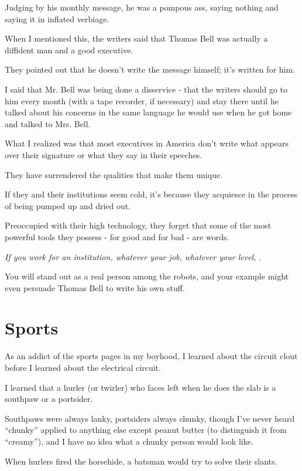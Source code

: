 \documentclass{book}
\numberwithin{equation}{section}
\begin{document}
Judging by his monthly message, he was a pompous ass, saying nothing and saying it in inflated verbiage.

%
When I mentioned this, the writers said that Thomas Bell was actually a diffident man and a good executive.

They pointed out that he doesn't write the message himself; it's written for him.

I said that Mr. Bell was being done a disservice - that the writers should go to him every month (with a tape recorder, if necessary) and stay there until he talked about his concerns in the same language he would use when he got home and talked to Mrs. Bell.

%
What I realized was that most executives in America don't write what appears over their signature or what they say in their speeches.

They have surrendered the qualities that make them unique.

If they and their institutions seem cold, it's because they acquiesce in the process of being pumped up and dried out.

Preoccupied with their high technology, they forget that some of the most powerful tools they possess - for good and for bad - are words.

%
\textit{If you work for an institution, whatever your job, whatever your level, }.

You will stand out as a real person among the robots, and your example might even persuade Thomas Bell to write his own stuff.


\chapter{Sports}

As an addict of the sports pages in my boyhood, I learned about the circuit clout before I learned about the electrical circuit.

I learned that a hurler (or twirler) who faces left when he does the slab is a southpaw or a portsider.

Southpaws were always lanky, portsiders always chunky, though I've never heard ``chunky'' applied to anything else except peanut butter (to distinguish it from ``creamy''), and I have no idea what a chunky person would look like.

When hurlers fired the horsehide, a batsman would try to solve their slants.
\end{document}
